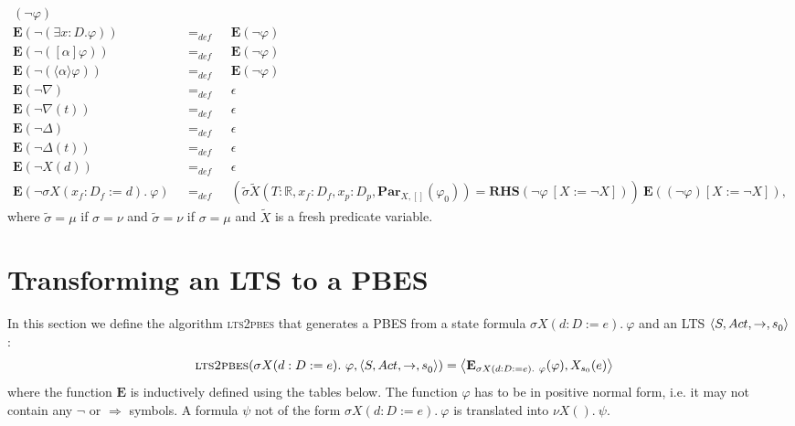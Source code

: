 \documentclass{article}
\begin{document}
\begin{equation*}
\begin{array}{lll}
(\lnot \varphi ) \\ 
{\mathbf{E}}(\lnot (\exists {x{:}D}.\varphi )) & =_{def} & {\mathbf{E}}%
(\lnot \varphi ) \\ 
{\mathbf{E}}(\lnot ([\alpha ]\varphi )) & =_{def} & {\mathbf{E}}(\lnot
\varphi ) \\ 
{\mathbf{E}}(\lnot (\langle \alpha \rangle \varphi )) & =_{def} & {\mathbf{E}%
}(\lnot \varphi ) \\ 
{\mathbf{E}}(\lnot \nabla ) & =_{def} & \epsilon \\ 
{\mathbf{E}}(\lnot \nabla (t)) & =_{def} & \epsilon \\ 
{\mathbf{E}}(\lnot \Delta ) & =_{def} & \epsilon \\ 
{\mathbf{E}}(\lnot \Delta (t)) & =_{def} & \epsilon \\ 
{\mathbf{E}}(\lnot X(d)) & =_{def} & \epsilon \\ 
{\mathbf{E}}(\lnot \sigma X(x_{f}{:}D_{f}:=d).~\varphi )~~~ & =_{def}~~~ & (%
\widetilde{\sigma }\tilde{X}(T:\mathbb{R},x_{f}{:}D_{f},x_{p}{:}D_{p},%
\mathbf{Par}_{X,[]}(\varphi _{0}))={\mathbf{RHS}}(\lnot \varphi ~[X:=\lnot
X]))~{\mathbf{E}}((\lnot \varphi )[X:=\lnot X]),%
\end{array}%
\end{equation*}%
\pagebreak where $\widetilde{\sigma }=\mu $ if $\sigma =\nu $ and $%
\widetilde{\sigma }=\nu $ if $\sigma =\mu $ and $\tilde{X}$ is a fresh
predicate variable.

\newpage

\section{Transforming an LTS to a PBES}

In this section we define the algorithm \textsc{lts2pbes} that generates a
PBES from a state formula $\sigma X(d:D:=e).~\varphi $ and an LTS $\langle {%
S,Act,\rightarrow ,s}_{0}\rangle $ : 
\begin{equation*}
\text{\textsc{lts2pbes}}(\sigma X(d:D:=e).~\varphi ,\langle {%
S,Act,\rightarrow ,s}_{0}\rangle )=\left\langle \mathbf{E}_{\sigma
X(d:D:=e).~\varphi }(\varphi ),X_{s_{0}}(e)\right\rangle
\end{equation*}%
where the function $\mathbf{E}$ is inductively defined using the tables
below. The function $\varphi $ has to be in positive normal form, i.e. it
may not contain any $\lnot $ or $\Rightarrow $ symbols. A formula $\psi $
not of the form $\sigma X(d:D:=e).~\varphi $ is translated into $\nu
X().~\psi $.
\end{document}
